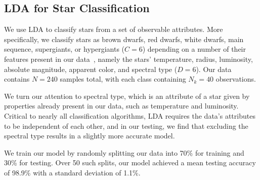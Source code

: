 \documentclass[letterpaper, 10 pt, conference]{ieeeconf}  %
\begin{document}
\subsection{LDA for Star Classification}
We use LDA to classify stars from a set of observable attributes.
More specifically, we classify stars as brown dwarfs, red dwarfs, white dwarfs, main sequence, supergiants, or hypergiants ($C=6$) depending on a number of their features present in our data~\cite{stardata}, namely the stars' temperature, radius, luminosity, absolute magnitude, apparent color, and spectral type ($D=6$).
Our data contains $N=240$ samples total, with each class containing $N_k=40$ observations.

We turn our attention to spectral type, which is an attribute of a star given by properties already present in our data, such as temperature and luminosity.
Critical to nearly all classification algorithms, LDA requires the data's attributes to be independent of each other, and in our testing, we find that excluding the spectral type results in a slightly more accurate model.

We train our model by randomly splitting our data into 70\% for training and 30\% for testing. 
Over 50 such splits, our model achieved a mean testing accuracy of 98.9\% with a standard deviation of 1.1\%.
\end{document}
